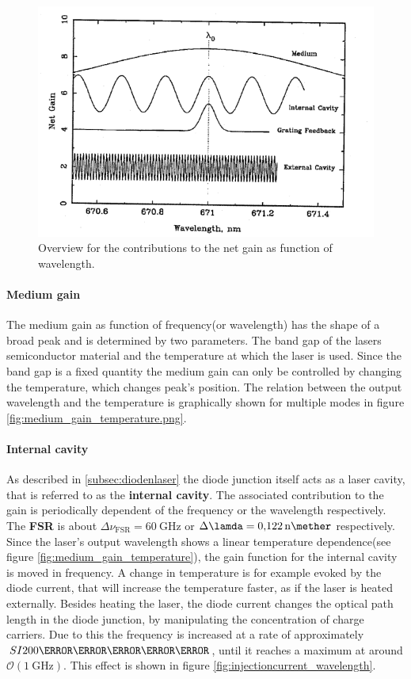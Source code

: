 \FloatBarrier
\begin{figure}
  \includegraphics{gain_overview.png}
  \caption{Overview for the contributions to the net gain as function of
            wavelength.\cite{sample}}
  \label{fig:gain_overview}
\end{figure}
\FloatBarrier


\paragraph{Medium gain}
The medium gain as function of frequency(or wavelength) has
the shape of a broad peak and is determined by two parameters.
The band gap of the lasers semiconductor material and the temperature
at which the laser is used. Since the band gap is a fixed
quantity the medium gain can only be controlled by changing
the temperature, which changes peak's position.
The relation between the output wavelength and the
temperature is graphically shown for multiple modes
in figure \ref{fig:medium_gain_temperature.png}.



\paragraph{Internal cavity}
As described in \ref{subsec:diodenlaser} the diode junction itself
acts as a laser cavity, that is referred to as the \textbf{internal cavity}.
The associated contribution to the gain is periodically dependent of
the frequency or the wavelength respectively. The \textbf{FSR} is about
$\Delta\nu_{\text{FSR}} = \SI{60}{\giga\hertz}$  or
$\Delta\lamda = \SI{0.122}{\nano\mether}$ respectively.
Since the laser's output wavelength shows a linear
temperature dependence(see figure \ref{fig:medium_gain_temperature}),
the gain function for the internal cavity is moved in frequency.
A change in temperature is for example evoked by the diode current,
that will increase the temperature faster, as if the laser is heated
externally. Besides heating the laser, the diode current changes the optical
path length in the diode junction, by manipulating the concentration
of charge carriers. Due to this the frequency is increased at a rate of
approximately $SI{200}{\mega\hertz\per\milli\ampere}$, until it reaches
a maximum at around $\mathcal{O}(\SI{1}{\giga\hertz})$.
This effect is shown in figure \ref{fig:injectioncurrent_wavelength}.



